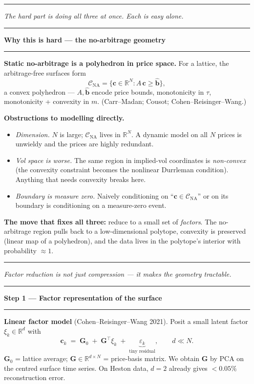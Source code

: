 \documentclass[12pt]{article}
\newcommand{\slide}[1]{%
  \par\noindent\rule{\linewidth}{1.2pt}\par\vspace{2pt}%
  {\LARGE\bfseries #1}\par\vspace{2pt}%
  \noindent\rule{\linewidth}{0.5pt}\par\vspace{8pt}}
\newcommand{\footer}[1]{\vfill\noindent\rule{\linewidth}{0.3pt}\par
  {\small\itshape #1}}
\newcommand{\R}{\mathbb{R}}
\newcommand{\cC}{\mathcal{C}}
\begin{document}
\footer{The hard part is doing all three at once. Each is easy alone.}
\clearpage

\slide{Why this is hard --- the no-arbitrage geometry}

\textbf{Static no-arbitrage is a polyhedron in price space.}
For a lattice, the arbitrage-free surfaces form
\[
\cC_{\mathrm{NA}} = \{\mathbf c \in \R^N : A\,\mathbf c \ge \mathbf{\hat b}\},
\]
a convex polyhedron --- $A,\mathbf{\hat b}$ encode price bounds, monotonicity
in $\tau$, monotonicity + convexity in $m$. (Carr--Madan; Cousot;
Cohen--Reisinger--Wang.)

\vspace{6pt}
\textbf{Obstructions to modelling directly.}
\begin{itemize}
\item \emph{Dimension.} $N$ is large; $\cC_{\mathrm{NA}}$ lives in $\R^N$.
  A dynamic model on all $N$ prices is unwieldy and the prices are highly
  redundant.
\item \emph{Vol space is worse.} The same region in implied-vol coordinates
  is \emph{non-convex} (the convexity constraint becomes the nonlinear
  Durrleman condition). Anything that needs convexity breaks here.
\item \emph{Boundary is measure zero.} Naively conditioning on
  ``$\mathbf c \in \cC_{\mathrm{NA}}$'' or on its boundary is conditioning
  on a measure-zero event.
\end{itemize}

\vspace{6pt}
\textbf{The move that fixes all three:} reduce to a small set of
\emph{factors}. The no-arbitrage region pulls back to a low-dimensional
polytope, convexity is preserved (linear map of a polyhedron), and the data
lives in the polytope's interior with probability $\approx 1$.

\footer{Factor reduction is not just compression --- it makes the geometry tractable.}
\clearpage

\slide{Step 1 --- Factor representation of the surface}

\textbf{Linear factor model} (Cohen--Reisinger--Wang 2021).
Posit a small latent factor $\xi_k \in \R^d$ with
\[
\mathbf c_k \;=\; \mathbf G_0 \;+\; \mathbf G^\top \xi_k \;+\;
\underbrace{\varepsilon_k}_{\text{tiny residual}},
\qquad d \ll N.
\]
$\mathbf G_0$ = lattice average; $\mathbf G \in \R^{d\times N}$ = price-basis
matrix. We obtain $\mathbf G$ by PCA on the centred surface time series.
On Heston data, $d=2$ already gives $<0.05\%$ reconstruction error.
\end{document}
